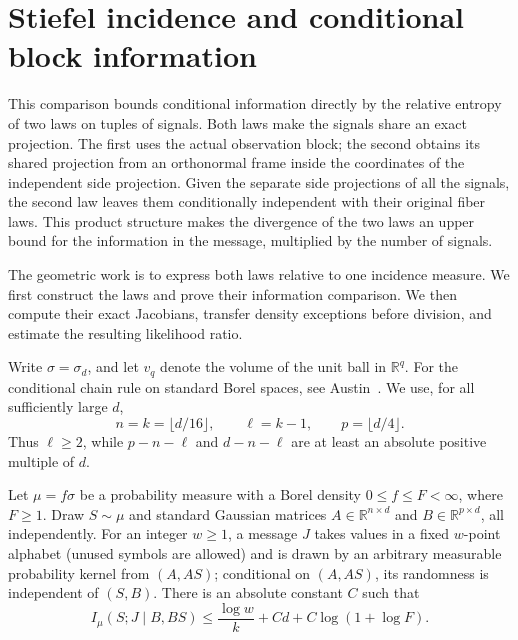 \section{Stiefel incidence and conditional block information}
\label{sec:incidence}

This comparison bounds conditional information directly by the relative
entropy of two laws on tuples of signals.  Both laws make the signals share
an exact projection.  The first uses the actual observation block; the
second obtains its shared projection from an orthonormal frame inside the
coordinates of the independent side projection.  Given the separate side
projections of all the signals, the second law leaves them conditionally
independent with their original fiber laws.  This product structure makes
the divergence of the two laws an upper bound for the information in the
message, multiplied by the number of signals.

The geometric work is to express both laws relative to one incidence
measure.  We first construct the laws and prove their information
comparison.  We then compute their exact Jacobians, transfer density
exceptions before division, and estimate the resulting likelihood ratio.

Write \(\sigma=\sigma_d\), and let \(v_q\) denote the volume of the
unit ball in \(\mathbb R^q\).  For the conditional chain rule on standard
Borel spaces, see
Austin~\cite[Sections~3.3--3.4]{Austin2020}.  We use, for all sufficiently
large \(d\),
\begin{equation}\label{inc:dimensions}
 n=k=\lfloor d/16\rfloor,\qquad
 \ell=k-1,\qquad p=\lfloor d/4\rfloor .
\end{equation}
Thus \(\ell\ge2\), while \(p-n-\ell\) and \(d-n-\ell\) are at least an
absolute positive multiple of \(d\).

\begin{proposition}\label{inc:block}
Let \(\mu=f\sigma\) be a probability measure with a Borel density
\(0\le f\le F<\infty\), where \(F\ge1\).  Draw \(S\sim\mu\) and standard
Gaussian matrices \(A\in\mathbb R^{n\times d}\) and
\(B\in\mathbb R^{p\times d}\), all independently.  For an integer
\(w\ge1\), a message \(J\) takes values in a fixed \(w\)-point alphabet
(unused symbols are allowed) and is drawn by an arbitrary measurable
probability kernel from
\((A,AS)\); conditional on \((A,AS)\), its randomness is independent of
\((S,B)\).  There is an absolute constant \(C\) such that
\begin{equation}\label{inc:block-bound}
 I_\mu(S;J\mid B,BS)
 \le \frac{\log w}{k}+Cd+C\log(1+\log F).
\end{equation}
\end{proposition}


